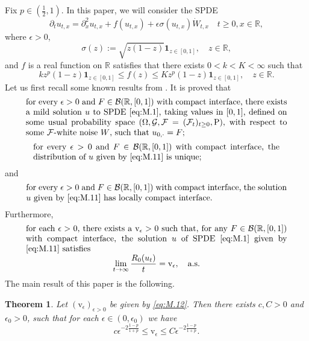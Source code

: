 \documentclass[12pt,a4paper]{amsart}
\numberwithin{equation}{section}
\theoremstyle{plain}
\newtheorem{theorem}{Theorem}[section]
\theoremstyle{remark}
\begin{document}
	Fix $p\in (\frac{1}{2},1)$.
	In this paper, we will consider the SPDE
\begin{equation} \label{eq:M.1}
	\partial_t u_{t,x} 
	= \partial_x^2 u_{t,x} + f(u_{t,x}) + \epsilon \sigma(u_{t,x}) \dot W_{t,x} \quad t\geq 0, x\in \mathbb R,
\end{equation}
	where $\epsilon > 0$,  
\[
	\sigma(z) := \sqrt{z(1-z)} \mathbf 1_{z\in [0,1]}, \quad z\in \mathbb R,
\]
and $f$ is a real function on $\mathbb R$ satisfies that there exists $0< k<K<\infty$ such that
\[
	kz^p(1-z)\mathbf 1_{z\in [0,1]}\leq f (z)\leq Kz^p(1-z)\mathbf 1_{z\in [0,1]}, \quad z\in \mathbb R.
\] 
	Let us first recall some known results from \cite{MuellerMytnikRyzhik2019TheSpeed}. 
	It is proved that
\begin{equation}\label{eq:M.11}
\begin{minipage}{0.9\textwidth}
	for every $\epsilon > 0$ and $F \in \mathcal B(\mathbb R, [0,1])$ with compact interface,  there exists a mild solution $u$ to SPDE \eqref{eq:M.1}, taking values in $[0,1]$, defined on some usual probability space $(\Omega, \mathcal G, \mathcal F=(\mathcal F_t)_{t\geq 0}, \mathrm P)$, with respect to some $\mathcal F$-white noise $W$, such that $u_{0,\cdot} = F$;
\end{minipage}
\end{equation}
\begin{equation}\label{eq:M.115}
 \begin{minipage}{0.85\textwidth}
for every $\epsilon>0$ and $F\in \mathcal B(\mathbb R, [0,1])$ with compact interface, the distribution of  $u$ given by \eqref{eq:M.11} is unique;
\end{minipage}
\end{equation}
and 
\begin{equation} \label{eq:M.116}
\begin{minipage}{0.9\textwidth}
	for every $\epsilon>0$ and $F\in \mathcal B(\mathbb R, [0,1])$ with compact interface, the solution $u$ given by \eqref{eq:M.11} has locally compact interface.
\end{minipage}
\end{equation}
	Furthermore, 
\begin{equation}\label{eq:M.12}
\begin{minipage}{0.9\textwidth}
	for each $\epsilon > 0$, there exists a $\mathrm v_{\epsilon}>0$ such that, for any $F \in \mathcal B(\mathbb R, [0,1])$ with compact interface, the solution $u$ of SPDE \eqref{eq:M.1} given by \eqref{eq:M.11} satisfies
	\[
	\lim_{t\to \infty} \frac{R_0(u_t)}{t}
	= \mathrm v_\epsilon, \quad \text{a.s.}
	\]
\end{minipage}\\
\end{equation}
	The main result of this paper is the following.
\begin{theorem} \label{thm:M.2}
	\color{blue}
	Let $(\mathrm v_\epsilon)_{\epsilon>0}$ be given by \eqref{eq:M.12}.
	Then there exists $c,C>0$ and $\epsilon_0 > 0$, such that for each $\epsilon \in (0, \epsilon_0)$ we have
\[
	c \epsilon^{-2 \frac {1-p}{1+p}} \leq \mathrm v_{\epsilon} \leq C \epsilon^{-2 \frac {1-p}{1+p}}.
\]
\end{theorem}
\end{document}
